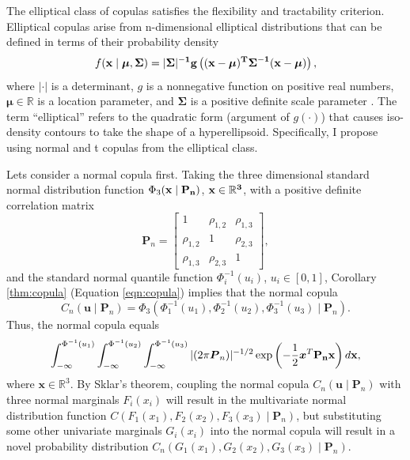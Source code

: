 \documentclass[12pt]{report}
\begin{document}
The elliptical class of
copulas satisfies the flexibility and tractability criterion. Elliptical copulas arise from n-dimensional elliptical distributions that can be defined in terms of their probability density
\begin{equation}
f(\bf{x} \mid \boldsymbol{\mu}, \boldsymbol{\Sigma}) = |\boldsymbol{\Sigma}|^{-1}g \left((x - \boldsymbol{\mu})^T\boldsymbol{\Sigma}^{-1}(x - \boldsymbol{\mu})\right),
\end{equation}
where $|\cdot|$ is a determinant, $g$ is a nonnegative function on positive real numbers, $\boldsymbol{\mu} \in \mathbb{R}$ is a location parameter, and $\boldsymbol{\Sigma}$ is a positive definite scale parameter \citep{Joe1997,Nel2007}. The term ``elliptical'' refers to the quadratic form (argument of $g(\cdot)$) that causes iso-density contours to take the shape of a hyperellipsoid.
Specifically, I propose
using normal and t copulas from the elliptical class. 

Lets consider a normal copula first. Taking the three dimensional standard normal distribution function  $\Phi_3(\bf{x} \mid \bf{P_n})$, $\bf{x} \in \mathbb{R}^3$, with a positive definite correlation matrix 
%
\begin{equation}
\boldsymbol{P}_n = \left[ \begin{array}{ccc}
1 & \rho_{1, 2} & \rho_{1, 3} \\
\rho_{1, 2} & 1 & \rho_{2, 3} \\
\rho_{1, 3} & \rho_{2, 3} & 1
\end{array}
\right], \nonumber
\end{equation}
%
and the standard normal quantile function $\Phi_i^{-1}(u_i)$, $u_i \in [0, 1]$, Corollary \ref{thm:copula} (Equation \ref{eqn:copula}) implies that the normal copula 
%
\begin{equation}
C_n (\boldsymbol{u} \mid \boldsymbol{P}_n) 
  = \Phi_3(\Phi_1^{-1}(u_1),
               \Phi_2^{-1}(u_2),
               \Phi_3^{-1}(u_3) \mid \boldsymbol{P}_n).
\end{equation}
%
Thus, the normal copula equals
%
\begin{eqnarray}
\int_{-\infty}^{\Phi^{-1}(u_1)} \int_{-\infty}^{\Phi^{-1}(u_2)} 
        \int_{-\infty}^{\Phi^{-1}(u_3)} 
        |(2\pi\boldsymbol{P}_n)|^{-1 / 2}\exp\left(-\frac{1}{2}\boldsymbol{x}^T
\bf{P}_n \bf{x}\right)d\bf{x},
\end{eqnarray}
%
where $\boldsymbol{x} \in \mathbb{R}^3$.
By Sklar's theorem, coupling the normal copula $C_n (\boldsymbol{u} \mid \boldsymbol{P}_n)$ with three normal
marginals $F_i(x_i)$ will result in the
multivariate normal distribution function $C(F_1(x_1), F_2(x_2), F_3(x_3) \mid \boldsymbol{P}_n)$, but substituting some other univariate marginals $G_i(x_i)$ into
the normal copula will result in a novel probability distribution $C_n(G_1(x_1), G_2(x_2), G_3(x_3) \mid \boldsymbol{P}_n)$.
\end{document}
